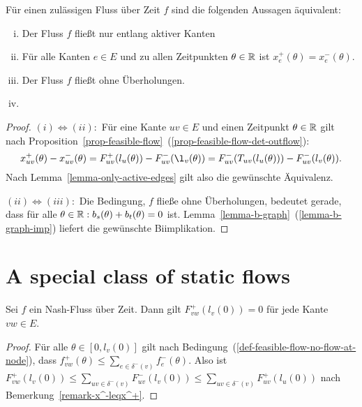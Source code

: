 \begin{theorem}\label{thm-equivalencies-nash-flow}
	Für einen zulässigen Fluss über Zeit $f$ sind die folgenden Aussagen äquivalent:
	\begin{enumerate}[(i)]
		\item Der Fluss $f$ fließt nur entlang aktiver Kanten
		\item Für alle Kanten $e\in E$ und zu allen Zeitpunkten $\theta\in\mathbb{R}$ ist $x_e^+(\theta) = x_e^-(\theta)$.
		\item Der Fluss $f$ fließt ohne Überholungen.
		\item {}
	\end{enumerate}
\end{theorem}
\begin{proof}
	$(i) \Leftrightarrow (ii):$ Für eine Kante $uv\in E$ und einen Zeitpunkt $\theta\in\mathbb{R}$ gilt nach Proposition~\ref{prop-feasible-flow}~(\ref{prop-feasible-flow-det-outflow}):
	$$x_{uv}^+(\theta) - x_{uv}^-(\theta) = F_{uv}^+(l_u(\theta)) - F_{uv}^-(\l_v(\theta)) = F_{uv}^-(T_{uv}(l_u(\theta))) - F_{uv}^-(l_v(\theta)).$$
	Nach Lemma~\ref{lemma-only-active-edges} gilt also die gewünschte Äquivalenz.
	
	$(ii) \Leftrightarrow (iii):$ Die Bedingung, $f$ fließe ohne Überholungen, bedeutet gerade, dass für alle $\theta\in\mathbb{R}: b_s(\theta) + b_t(\theta) = 0$ ist.
	Lemma~\ref{lemma-b-graph}~(\ref{lemma-b-graph-imp}) liefert die gewünschte Biimplikation.
\end{proof}

\section{A special class of static flows}

\begin{lemma}\label{lemma-no-inflow-until-l}
	Sei $f$ ein Nash-Fluss über Zeit.
	Dann gilt $F_{vw}^+(l_v(0)) = 0$ für jede Kante $vw\in E$.
\end{lemma}
\begin{proof}
	Für alle $\theta\in [0, l_v(0)]$ gilt nach Bedingung~(\ref{def-feasible-flow-no-flow-at-node}), dass $f_{vw}^+(\theta) \leq \sum_{e\in\delta^-(v)} f_e^-(\theta)$.
	Also ist $F_{vw}^+(l_v(0)) \leq \sum_{uv\in\delta^-(v)} F_{uv}^-(l_v(0))\leq \sum_{uv\in\delta^-(v)} F_{uv}^+(l_u(0))$ nach Bemerkung~\ref{remark-x^-leqx^+}.
\end{proof}

